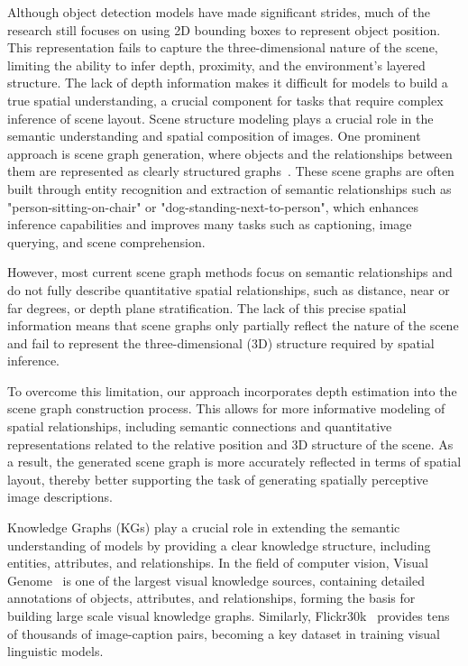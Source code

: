 \documentclass[runningheads,14pt]{llncs}
\begin{document}
Although object detection models have made significant strides, much of the research still focuses on using 2D bounding boxes to represent object position. This representation fails to capture the three-dimensional nature of the scene, limiting the ability to infer depth, proximity, and the environment's layered structure. The lack of depth information makes it difficult for models to build a true spatial understanding, a crucial component for tasks that require complex inference of scene layout.
Scene structure modeling plays a crucial role in the semantic understanding and spatial composition of images. One prominent approach is scene graph generation, where objects and the relationships between them are represented as clearly structured graphs~\cite{yao2018exploring,zhong2020comprehensive}. These scene graphs are often built through entity recognition and extraction of semantic relationships such as "person-sitting-on-chair" or "dog-standing-next-to-person", which enhances inference capabilities and improves many tasks such as captioning, image querying, and scene comprehension.

However, most current scene graph methods focus on semantic relationships and do not fully describe quantitative spatial relationships, such as distance, near or far degrees, or depth plane stratification. The lack of this precise spatial information means that scene graphs only partially reflect the nature of the scene and fail to represent the three-dimensional (3D) structure required by spatial inference.

To overcome this limitation, our approach incorporates depth estimation into the scene graph construction process. This allows for more informative modeling of spatial relationships, including semantic connections and quantitative representations related to the relative position and 3D structure of the scene. As a result, the generated scene graph is more accurately reflected in terms of spatial layout, thereby better supporting the task of generating spatially perceptive image descriptions.

Knowledge Graphs (KGs) play a crucial role in extending the semantic understanding of models by providing a clear knowledge structure, including entities, attributes, and relationships. In the field of computer vision, Visual Genome~\cite{krishna2017visual} is one of the largest visual knowledge sources, containing detailed annotations of objects, attributes, and relationships, forming the basis for building large scale visual knowledge graphs. Similarly, Flickr30k~\cite{flickr30k} provides tens of thousands of image-caption pairs, becoming a key dataset in training visual linguistic models.
\end{document}
